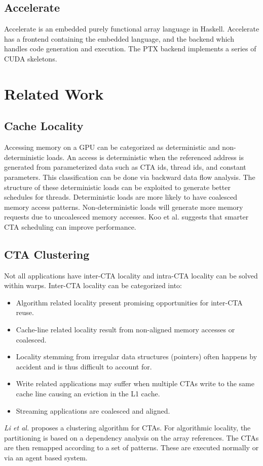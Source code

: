 \documentclass{article}
\newcommand{\TODO}[1]{\noindent{\color{red}\textbf{[TODO] #1}}}
\begin{document}
\begin{multicols}{2}

\subsection{Accelerate}
Accelerate is an embedded purely functional array language in Haskell.
\cite{chakravarty2011accelerating}
Accelerate has a frontend containing the embedded language, and the backend which handles code generation and execution.
The PTX backend implements a series of CUDA skeletons.

\TODO{Explain Accelerate execution model}

\section{Related Work}

\subsection{Cache Locality}
Accessing memory on a GPU can be categorized as deterministic and non-deterministic loads.
An access is deterministic when the referenced address is generated from parameterized data such as CTA ids, thread ids, and constant parameters.
This classification can be done via backward data flow analysis. The structure of these deterministic loads can be exploited to generate better schedules for threads.
Deterministic loads are more likely to have coalesced memory access patterns. 
Non-deterministic loads will generate more memory requests due to uncoalesced memory accesses.
Koo et al. suggests that smarter CTA scheduling can improve performance.
\cite{koo2015revealing}

\subsection{CTA Clustering}
Not all applications have inter-CTA locality and intra-CTA locality can be solved within warps.
Inter-CTA locality can be categorized into:
\begin{itemize}
    \item Algorithm related locality present promising opportunities for inter-CTA reuse.
    \item Cache-line related locality result from non-aligned memory accesses or coalesced.
    \item Locality stemming from irregular data structures (pointers) often happens by accident and is thus difficult to account for.
    \item Write related applications may suffer when multiple CTAs write to the same cache line causing an eviction in the L1 cache.
    \item Streaming applications are coalesced and aligned.
\end{itemize}
\emph{Li et al.} proposes a clustering algorithm for CTAs.
For algorithmic locality, the partitioning is based on a dependency analysis on the array references.
The CTAs are then remapped according to a set of patterns.
These are executed normally or via an agent based system.
\cite{li2017locality}


\end{multicols}
\end{document}
